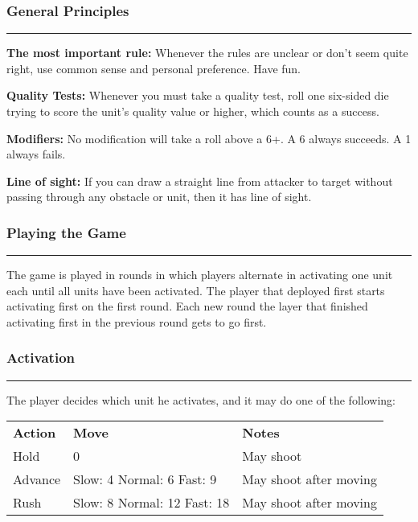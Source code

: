 \documentclass[11pt]{article}
\newcommand{\myheading}[1]{
  \subsubsection*{\centering #1}
  \raggedright
  \hrule
}
\renewenvironment{description}
  {\list{}{\labelwidth=0pt \leftmargin=0pt
   \let\makelabel\descriptionlabel}}
  {\endlist}
\newenvironment{mydescription}{
\begin{description}
  \setlength{\itemsep}{1pt}
  \setlength{\parskip}{0pt}
  \setlength{\parsep}{0pt}}{\end{description}
}
\begin{document}
\begin{multicols*}{3}[]

\raggedcolumns

\myheading{General Principles}

\begin{mydescription}

\item{\bf The most important rule:} Whenever the rules are unclear or
  don’t seem quite right, use common sense and personal
  preference. Have fun.

\item{\bf Quality Tests:} Whenever you must take a quality test, roll
  one six-sided die trying to score the unit’s quality value or
  higher, which counts as a success.

\item{\bf Modifiers:} No modification will take a roll above a 6+. A 6
  always succeeds. A 1 always fails.

\item{\bf Line of sight:} If you can draw a straight line from
  attacker to target without passing through any obstacle or unit,
  then it has line of sight.

\end{mydescription}

\myheading{Playing the Game}

The game is played in rounds in which players alternate in activating
one unit each until all units have been activated. The player that
deployed first starts activating first on the first round. Each new
round the layer that finished activating first in the previous round
gets to go first.

\myheading{Activation}

The player decides which unit he activates, and it may do one of the
following:

\noindent 
{}
\begin{tabular}{lp{2cm}p{2cm}}
\bf{Action} & \bf{Move} & \bf{Notes} \\
Hold & 0 & May shoot \\
Advance & Slow: 4 \newline Normal: 6 \newline Fast: 9 & May shoot
                                                        after moving \\
Rush & Slow: 8 \newline Normal: 12 \newline Fast: 18 & May shoot
                                                        after moving \\
\end{tabular}


\end{multicols*}
\end{document}
